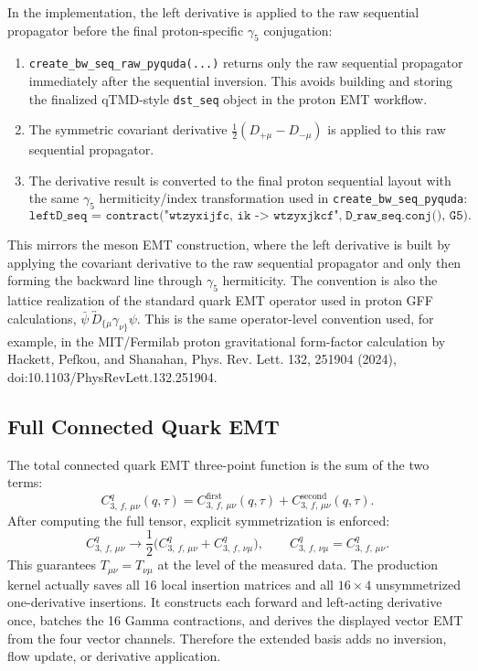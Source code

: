 \documentclass[11pt,a4paper]{article}
\newcommand{\momtrans}{q}
\begin{document}
In the implementation, the left derivative is applied to the raw sequential
propagator before the final proton-specific $\gamma_{5}$ conjugation:
\begin{enumerate}
  \item \texttt{create\_bw\_seq\_raw\_pyquda(...)} returns only the raw
        sequential propagator immediately after the sequential inversion.  This
        avoids building and storing the finalized qTMD-style \texttt{dst\_seq}
        object in the proton EMT workflow.
  \item The symmetric covariant derivative $\frac{1}{2}(D_{+\mu}-D_{-\mu})$ is
        applied to this raw sequential propagator.
  \item The derivative result is converted to the final proton sequential layout
        with the same $\gamma_{5}$ hermiticity/index transformation used in
        \texttt{create\_bw\_seq\_pyquda}:
        \begin{equation}
          \texttt{leftD\_seq = contract("wtzyxijfc, ik -> wtzyxjkcf",}
          \;\texttt{D\_raw\_seq.conj(), G5)}.
        \end{equation}
\end{enumerate}
This mirrors the meson EMT construction, where the left derivative is built by
applying the covariant derivative to the raw sequential propagator and only then
forming the backward line through $\gamma_{5}$ hermiticity.  The convention is
also the lattice realization of the standard quark EMT operator used in proton
GFF calculations, $\bar\psi\,\overleftrightarrow{D}_{\{\mu}\gamma_{\nu\}}\psi$.
This is the same operator-level convention used, for example, in the
MIT/Fermilab proton gravitational form-factor calculation by Hackett, Pefkou,
and Shanahan, Phys. Rev. Lett. 132, 251904 (2024),
doi:10.1103/PhysRevLett.132.251904.

\subsection{Full Connected Quark EMT}
\label{sec:C3_total}

The total connected quark EMT three-point function is the sum of the two terms:
\begin{equation}
  \boxed{
  C_{3,\,f,\,\mu\nu}^{q}(\momtrans,\tau)
  = C_{3,\,f,\,\mu\nu}^{\text{first}}(\momtrans,\tau)
  + C_{3,\,f,\,\mu\nu}^{\text{second}}(\momtrans,\tau).
  }
  \label{eq:C3_total}
\end{equation}
After computing the full tensor, explicit symmetrization is enforced:
\begin{equation}
  C_{3,\,f,\,\mu\nu}^{q} \to \frac{1}{2}\big(C_{3,\,f,\,\mu\nu}^{q} + C_{3,\,f,\,\nu\mu}^{q}\big),
  \qquad
  C_{3,\,f,\,\nu\mu}^{q} = C_{3,\,f,\,\mu\nu}^{q}.
\end{equation}
This guarantees $T_{\mu\nu} = T_{\nu\mu}$ at the level of the measured data.
The production kernel actually saves all 16 local insertion matrices and all
\(16\times4\) unsymmetrized one-derivative insertions.  It constructs each
forward and left-acting derivative once, batches the 16 Gamma contractions,
and derives the displayed vector EMT from the four vector channels.  Therefore
the extended basis adds no inversion, flow update, or derivative application.
\end{document}
